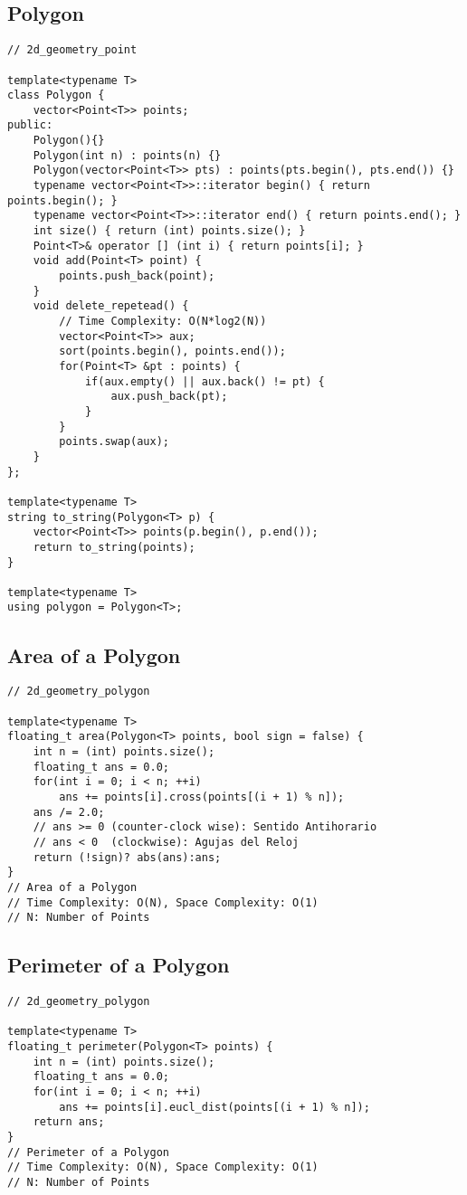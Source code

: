 \documentclass[10pt,letterpaper,twocolumn,twosided]{article}
\begin{document}
\subsection{Polygon}
\begin{lstlisting}
// 2d_geometry_point

template<typename T>
class Polygon {
    vector<Point<T>> points;
public:
    Polygon(){}
    Polygon(int n) : points(n) {}
    Polygon(vector<Point<T>> pts) : points(pts.begin(), pts.end()) {}
    typename vector<Point<T>>::iterator begin() { return points.begin(); }
    typename vector<Point<T>>::iterator end() { return points.end(); }
    int size() { return (int) points.size(); }
    Point<T>& operator [] (int i) { return points[i]; }
    void add(Point<T> point) {
        points.push_back(point);
    }
    void delete_repetead() {
        // Time Complexity: O(N*log2(N))
        vector<Point<T>> aux;
        sort(points.begin(), points.end());
        for(Point<T> &pt : points) {
            if(aux.empty() || aux.back() != pt) {
                aux.push_back(pt);
            }
        }
        points.swap(aux);
    }
};

template<typename T>
string to_string(Polygon<T> p) {
    vector<Point<T>> points(p.begin(), p.end());
    return to_string(points);
}

template<typename T>
using polygon = Polygon<T>;
\end{lstlisting}

\subsection{Area of a Polygon}
\begin{lstlisting}
// 2d_geometry_polygon

template<typename T>
floating_t area(Polygon<T> points, bool sign = false) {
    int n = (int) points.size();
    floating_t ans = 0.0;
    for(int i = 0; i < n; ++i)
        ans += points[i].cross(points[(i + 1) % n]);
    ans /= 2.0;
    // ans >= 0 (counter-clock wise): Sentido Antihorario
    // ans < 0  (clockwise): Agujas del Reloj
    return (!sign)? abs(ans):ans;
}
// Area of a Polygon
// Time Complexity: O(N), Space Complexity: O(1)
// N: Number of Points
\end{lstlisting}

\subsection{Perimeter of a Polygon}
\begin{lstlisting}
// 2d_geometry_polygon

template<typename T>
floating_t perimeter(Polygon<T> points) {
    int n = (int) points.size();
    floating_t ans = 0.0;
    for(int i = 0; i < n; ++i)
        ans += points[i].eucl_dist(points[(i + 1) % n]);
    return ans;
}
// Perimeter of a Polygon
// Time Complexity: O(N), Space Complexity: O(1)
// N: Number of Points
\end{lstlisting}
\end{document}
